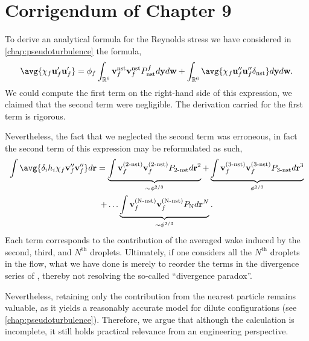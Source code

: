 
\section{Corrigendum of Chapter 9}

To derive an analytical formula for the Reynolds stress we have considered in \ref{chap:pseudoturbulence} the formula,
\begin{equation}
    \avg{\chi_f \textbf{u}_f'\textbf{u}_f'}
    = 
    \phi_f
    \int_{\mathbb{R}^6}
    \textbf{v}_f^\text{nst}
    \textbf{v}_f^\text{nst}
    P_\text{nst}^f
    d\textbf{y}
    d\textbf{w}
    + 
    \int_{\mathbb{R}^6}
    \avg{
        \chi_f
        \textbf{u}_f''
        \textbf{u}_f''
        \delta_\text{nst}
    }
    d\textbf{y}
    d\textbf{w}.
\end{equation}
We could compute the first term on the right-hand side of this expression, we claimed that the second term were negligible. 
The derivation carried for the first term is rigorous. 

Nevertheless, the fact that we neglected the second term was erroneous, in fact the second term of this expression may be reformulated as such, 
\begin{multline*}
    \int \avg{\delta_i h_i \chi_f \textbf{v}_f''\textbf{v}_f''}  d\textbf{r}
    = 
    \underbrace{\int 
    \textbf{v}^{(\text{2-nst})}_f
    \textbf{v}^{(\text{2-nst})}_f 
    P_\text{2-nst}
    d\textbf{r}^2}_{\sim \phi^{2/3}}
    +  
    \underbrace{\int 
    \textbf{v}^{(\text{3-nst})}_f
    \textbf{v}^{(\text{3-nst})}_f 
    P_\text{3-nst}
    d\textbf{r}^3}_{\phi^{2/3}}
    \\
    +\ldots\underbrace{\int 
    \textbf{v}^{(\text{N-nst})}_f
    \textbf{v}^{(\text{N-nst})}_f 
    P_\text{N}
    d\textbf{r}^N}_{  \sim \phi^{2/3}}. 
\end{multline*}
Each term corresponds to the contribution of the averaged wake induced by the second, third, and $N^{\text{th}}$ droplets.
Ultimately, if one considers all the $N^{\text{th}}$ droplets in the flow, what we have done is merely to reorder the terms in the divergence series of \citet{caflisch1985variance}, thereby not resolving the so-called ``divergence paradox''.

Nevertheless, retaining only the contribution from the nearest particle remains valuable, as it yields a reasonably accurate model for dilute configurations (see \ref{chap:pseudoturbulence}).
Therefore, we argue that although the calculation is incomplete, it still holds practical relevance from an engineering perspective.